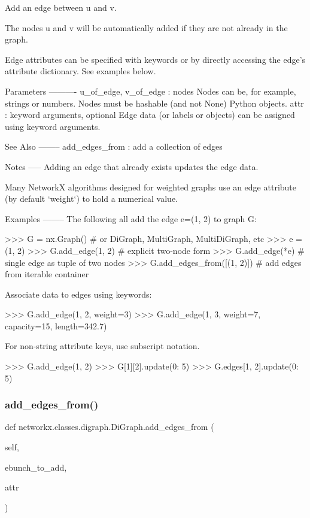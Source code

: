 \begin{DoxyVerb}Add an edge between u and v.

The nodes u and v will be automatically added if they are
not already in the graph.

Edge attributes can be specified with keywords or by directly
accessing the edge's attribute dictionary. See examples below.

Parameters
----------
u_of_edge, v_of_edge : nodes
    Nodes can be, for example, strings or numbers.
    Nodes must be hashable (and not None) Python objects.
attr : keyword arguments, optional
    Edge data (or labels or objects) can be assigned using
    keyword arguments.

See Also
--------
add_edges_from : add a collection of edges

Notes
-----
Adding an edge that already exists updates the edge data.

Many NetworkX algorithms designed for weighted graphs use
an edge attribute (by default `weight`) to hold a numerical value.

Examples
--------
The following all add the edge e=(1, 2) to graph G:

>>> G = nx.Graph()  # or DiGraph, MultiGraph, MultiDiGraph, etc
>>> e = (1, 2)
>>> G.add_edge(1, 2)  # explicit two-node form
>>> G.add_edge(*e)  # single edge as tuple of two nodes
>>> G.add_edges_from([(1, 2)])  # add edges from iterable container

Associate data to edges using keywords:

>>> G.add_edge(1, 2, weight=3)
>>> G.add_edge(1, 3, weight=7, capacity=15, length=342.7)

For non-string attribute keys, use subscript notation.

>>> G.add_edge(1, 2)
>>> G[1][2].update({0: 5})
>>> G.edges[1, 2].update({0: 5})
\end{DoxyVerb}
 \mbox{\label{classnetworkx_1_1classes_1_1digraph_1_1DiGraph_a307a16c2da683dec6ce4c2dd73cf2448}} 
\subsubsection{\texorpdfstring{add\+\_\+edges\+\_\+from()}{add\_edges\_from()}}
{\footnotesize\ttfamily def networkx.\+classes.\+digraph.\+Di\+Graph.\+add\+\_\+edges\+\_\+from (\begin{DoxyParamCaption}\item[{}]{self,  }\item[{}]{ebunch\+\_\+to\+\_\+add,  }\item[{}]{attr }\end{DoxyParamCaption})}

